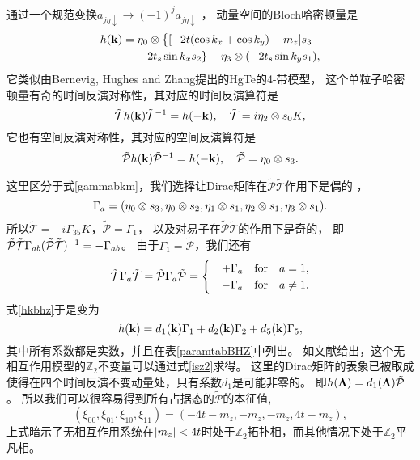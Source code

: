 通过一个规范变换$a_{j\eta\downarrow}\rightarrow (-1)^{j}a_{j\eta\downarrow}$ \cite{Liu2014}，
动量空间的Bloch哈密顿量是
\begin{equation}\label{hkbhz}
\begin{split}
		h(\vb k)&=\eta_0\otimes\big\{[-2t(\cos k_x+\cos k_y)-m_z] s_3\\
	&\quad -2t_s \sin k_x s_2\}+\eta_3\otimes(-2t_s \sin k_y s_1),
\end{split}
\end{equation}
它类似由Bernevig, Hughes and Zhang提出的HgTe的4-带模型，
这个单粒子哈密顿量有奇的时间反演对称性，其对应的时间反演算符是
\begin{equation}
	\tilde{\mathcal T}h(\vb k)\tilde{\mathcal T}^{-1} =h(-\vb k),\quad \tilde{\mathcal T}=i\eta_2\otimes s_0 K,\nonumber
\end{equation}
它也有空间反演对称性，其对应的空间反演算符是
\begin{equation}
	\tilde{\mathcal P}h(\vb k)\tilde{\mathcal P}^{-1} =h(-\vb k),\quad \tilde{\mathcal P}=\eta_0\otimes s_3.\nonumber
\end{equation}

这里区分于式\eqref{gammabkm}，我们选择让Dirac矩阵在$\tilde{\mathcal P}\tilde{\mathcal T}$作用下是偶的 \cite{Fu2007}，
\begin{equation*}
	\Gamma_a=\pqty{\eta_0\otimes s_3,\eta_0\otimes s_2,\eta_1\otimes s_1,\eta_2\otimes s_1,\eta_3\otimes s_1}.
\end{equation*}
所以$\tilde{\mathcal T}=-i\Gamma_{35}K$，$\tilde{\mathcal P}= \Gamma_1$，
以及对易子在$\tilde{\mathcal P}\tilde{\mathcal T}$的作用下是奇的，
即$\tilde{\mathcal P}\tilde{\mathcal T}\Gamma_{ab}(\tilde{\mathcal P}\tilde{\mathcal T})^{-1}=-\Gamma_{ab}$。
由于$\Gamma_1=\tilde{\mathcal P}$，我们还有
\begin{equation}
	\tilde{\mathcal T} \Gamma_a\tilde{\mathcal T}= \tilde{\mathcal P}\Gamma_a\tilde{\mathcal P}=\begin{cases}
		&+\Gamma_a \qfor a=1,\\
		&-\Gamma_a \qfor a\neq 1.
	\end{cases}\nonumber
\end{equation}
式\eqref{hkbhz}于是变为
\begin{equation}\label{hkbhz1}
	h(\vb k)=d_1(\vb k)\Gamma_1+d_{2}(\vb k)\Gamma_{2}+d_{5}(\vb k)\Gamma_{5},
\end{equation}
其中所有系数都是实数，并且在表\ref{paramtabBHZ}中列出。
如文献\cite{Fu2007}给出，这个无相互作用模型的$\mathbb Z_2$不变量可以通过式\eqref{isz2}求得。
这里的Dirac矩阵的表象已被取成使得在四个时间反演不变动量处，只有系数$d_1$是可能非零的。
即$h(\vb \Lambda )=d_1(\vb \Lambda )\tilde{\mathcal P}$。
所以我们可以很容易得到所有占据态的$\tilde{\mathcal P}$的本征值,
\begin{equation}
	(\xi_{00},\xi_{01},\xi_{10},\xi_{11})=(-4t-m_z,-m_z,-m_z,4t-m_z),\label{nonBHZis}
\end{equation}
上式暗示了无相互作用系统在$\abs{m_z}<4t$时处于$\mathbb Z_2$拓扑相，而其他情况下处于$\mathbb Z_2$平凡相。



